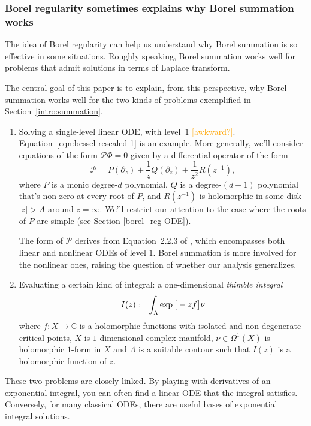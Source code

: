 \documentclass{article}
\newcommand*{\defeq}{\mathrel{\vcenter{\baselineskip0.5ex \lineskiplimit0pt
                     \hbox{\scriptsize.}\hbox{\scriptsize.}}}%
                     =}
\theoremstyle{definition}
\theoremstyle{plain}
\begin{document}
\subsubsection{Borel regularity sometimes explains why Borel summation works}\label{borel-reg:explanatory-power}
The idea of Borel regularity can help us understand why Borel summation is so effective in some situations. Roughly speaking, Borel summation works well for problems that admit solutions in terms of Laplace transform. 

The central goal of this paper is to explain, from this perspective, why Borel summation works well for the two kinds of problems exemplified in Section~\ref{intro:summation}.
\begin{enumerate}
\item Solving a single-level linear ODE, with level~$1$ \cite[Section 2.1]{EcalleIII}\cite[Section~5.2.2.1]{diverg-resurg-iii} \textcolor{orange}{[awkward?]}. Equation~\eqref{eqn:bessel-rescaled-1} is an example. More generally, we'll consider equations of the form $\mathcal{P} \Phi = 0$ given by a differential operator of the form
\[ \mathcal{P} = P(\partial_z) + \frac{1}{z} Q(\partial_z) + \frac{1}{z^2} R(z^{-1}), \]
where $P$ is a monic degree-$d$ polynomial, $Q$ is a degree-$(d-1)$ polynomial that's non-zero at every root of $P$, and $R(z^{-1})$ is holomorphic in some disk $|z| > A$ around $z = \infty$. We'll restrict our attention to the case where the roots of $P$ are simple (see Section \ref{borel_reg-ODE}).

The form of $\mathcal{P}$ derives from Equation~2.2.3 of \cite[pag. 105]{EcalleIII}, which encompasses both linear and nonlinear ODEs of level $1$. Borel summation is more involved for the nonlinear ones, raising the question of whether our analysis generalizes.
%
\item Evaluating a certain kind of integral: a one-dimensional {\em thimble integral}
%
\begin{equation*}
I(z)\defeq\int_{\Lambda}\exp\big[-z f\big] \nu
\end{equation*}
where $f\colon X\to \mathbb{C}$ is a holomorphic functions with isolated and non-degenerate critical points, $X$ is $1$-dimensional complex manifold, $\nu\in\Omega^1(X)$ is holomorphic $1$-form in $X$ and $\Lambda$ is a suitable contour such that $I(z)$ is a holomorphic function of $z$.  
\end{enumerate}
These two problems are closely linked. By playing with derivatives of an exponential integral, you can often find a linear ODE that the integral satisfies. Conversely, for many classical ODEs, there are useful bases of exponential integral solutions.
\end{document}
